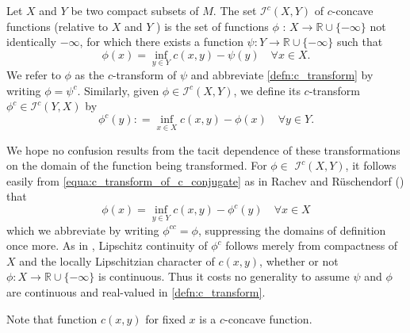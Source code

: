 \begin{defn} 
	Let \( X \) and \( Y \) be two compact subsets of \( M \).
	The set \( \mathcal{I} ^ { c } ( X , Y ) \) of \( c \)-concave functions (relative to \( X \) and \( Y \) ) is
	the set of functions \( \phi \) : \( X \rightarrow \mathbb { R } \cup \{ - \infty \} \) not identically \( - \infty \),
	for which there exists a function \( \psi : Y \rightarrow \mathbb { R } \cup \{ - \infty \} \) such that
	\begin{equation}
		\label{defn:c_transform}
		\phi ( x ) = \inf _ { y \in Y } c ( x , y ) - \psi ( y ) \quad \forall x \in X.
	\end{equation}
	We refer to \( \phi \) as the \( c \)-transform of \( \psi \) and abbreviate \cref{defn:c_transform}
	by writing \( \phi = \psi ^ { c } \).
	Similarly, given \( \phi \in \mathcal{I} ^ { c } ( X , Y ) \),
	we define its \( c \)-transform \( \phi ^ { c } \in \mathcal{I} ^ { c } ( Y , X ) \) by
	\begin{equation} 
					\label{equa:c_transform_of_c_conjugate}
	\phi ^ { c } ( y ) : = \inf _ { x \in X } c ( x , y ) - \phi ( x ) \quad \forall y \in Y.
	\end{equation}
\end{defn}

We hope no confusion results from the tacit dependence of
these transformations on the domain of the function being transformed.
For \( \phi \in \) \( \mathcal { I } ^ { c } ( X , Y ) \),
it follows easily from \cref{equa:c_transform_of_c_conjugate} as in Rachev and Rüschendorf
(\cite[Section 3.3]{Rachev1998}) that
\[ \phi ( x ) = \inf _ { y \in Y } c ( x , y ) - \phi ^ { c } ( y ) \quad \forall x \in X \]
which we abbreviate by writing \( \phi ^ { c c } = \phi \), suppressing the domains of definition once more.
As in \cite{mccann2001polar}, Lipschitz continuity of \( \phi ^ { c } \) follows merely from
compactness of \( X \) and the locally Lipschitzian character of \( c ( x , y ) \),
whether or not \( \phi : X \rightarrow \mathbb { R } \cup \{ - \infty \} \) is continuous.
Thus it costs no generality to
assume \( \psi \) and \( \phi \) are continuous and real-valued in \cref{defn:c_transform}.

Note that function $c(x,y)$ for fixed $x$ is a $c$-concave function.

